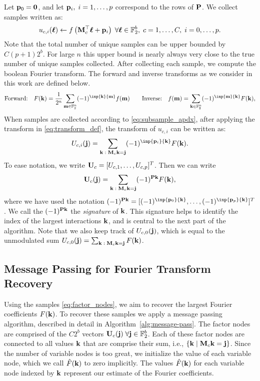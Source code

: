 Let $\mathbf p_0 = \boldsymbol{0}$, and let $\mathbf p_i,\;i=1,\dotsc,p$ correspond to the rows of $\mathbf P$. We collect samples written as:
\begin{equation}\label{eq:subsample_apdx}
    u_{c,i} (\boldsymbol{\ell}) \gets f\left(\mathbf M_c^{\top} \boldsymbol{\ell} + \mathbf p_i \right) \;\forall \boldsymbol{\ell} \in \mathbb F_2^b,\; c = 1,\dotsc, C,\;i=0, \dotsc, p.
\end{equation}
Note that the total number of unique samples can be upper bounded by $C(p+1)2^{b}$. For large $n$ this upper bound is nearly always very close to the true number of unique samples collected. After collecting each sample, we compute the boolean Fourier transform. The forward and inverse transforms as we consider in this work are defined below.
\begin{equation}\label{eq:transform_def}
    \text{Forward:}\quad F(\bk) = \frac{1}{2^{n}} \sum_{\bbm \in \bbF_2^n} (-1)^{\inp{\bk}{\bbm}}f(\bbm) \qquad \text{Inverse:}\quad f(\bbm)  = \sum_{\bk \in \bbF_2^n} (-1)^{\inp{\bbm}{\bk}} F(\bk),
\end{equation}
When samples are collected according to \eqref{eq:subsample_apdx}, after applying the transform in \eqref{eq:transform_def}, the transform of $u_{c,i}$ can be written as:
\begin{equation} \label{eq:alais_apdx}
    U_{c,i}(\bj) = \sum_{\bk\; : \;\bM_c \bk = \bj} (-1)^{\inp{\bp_i}{\bk}} F(\bk).
\end{equation}
To ease notation, we write $\mathbf U_c = [U_{c,1}, \dotsc, U_{c,p}]^T$. Then we can write
\begin{equation}\label{eq:factor_nodes}
    \mathbf U_c(\mathbf j) = \sum_{\mathbf k\; : \;\mathbf M_c \mathbf k = \mathbf j} (-1)^{\mathbf P \mathbf k} F(\mathbf k),
\end{equation}
where we have used the notation $(-1)^{\bP \bk} = [(-1)^{\inp{\bp_0}{\bk}}, \dots, (-1)^{\inp{\bp_p}{\bk}}]^T$. We call the $(-1)^{\mathbf P \mathbf k}$ the \emph{signature} of $\mathbf k$. This signature helps to identify the index of the largest interactions $\mathbf k$, and is central to the next part of the algorithm. Note that we also keep track of $U_{c,0}(\mathbf j)$, which is equal to the unmodulated sum $U_{c,0}(\mathbf j) = \sum_{\mathbf k\; : \;\mathbf M_c \mathbf k = \mathbf j} F(\mathbf k)$.
\subsection{Message Passing for Fourier Transform Recovery}
Using the samples \eqref{eq:factor_nodes}, we aim to recover the largest Fourier coefficients $F(\mathbf k)$. To recover these samples we apply a message passing algorithm, described in detail in Algorithm~\ref{alg:message-pass}. The factor nodes are comprised of the $C2^b$ vectors $\mathbf U_c(\mathbf j) \; \forall \mathbf j \in \mathbb F_2^b$. Each of these factor nodes are connected to all values $\mathbf k$ that are comprise their sum, i.e., $\{\mathbf k\mid \mathbf M_c \mathbf k = \mathbf j\}$. Since the number of variable nodes is too great, we initialize the value of each variable node, which we call $\hat{F}(\mathbf k)$ to zero implicitly. The values $\hat{F}(\mathbf k)$ for each variable node indexed by $\mathbf k$ represent our estimate of the Fourier coefficients. 




